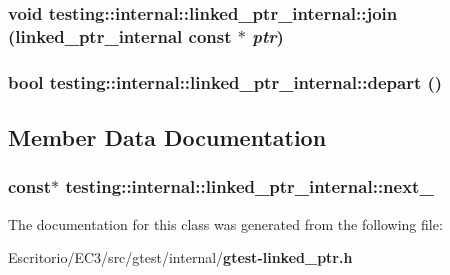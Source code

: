 \subsubsection{\setlength{\rightskip}{0pt plus 5cm}void testing::internal::linked\_\-ptr\_\-internal::join ({\bf linked\_\-ptr\_\-internal} const $\ast$ {\em ptr})\hspace{0.3cm}{\tt  [inline]}}\label{classtesting_1_1internal_1_1linked__ptr__internal_1dc51661a0b98ea373237b3d9eeb2bc9}


\subsubsection{\setlength{\rightskip}{0pt plus 5cm}bool testing::internal::linked\_\-ptr\_\-internal::depart ()\hspace{0.3cm}{\tt  [inline]}}\label{classtesting_1_1internal_1_1linked__ptr__internal_106b031aa6c9ddade172e45a578e8c80}




\subsection{Member Data Documentation}
\subsubsection{ const$\ast$ {\bf testing::internal::linked\_\-ptr\_\-internal::next\_\-}\hspace{0.3cm}{\tt  [mutable, private]}}\label{classtesting_1_1internal_1_1linked__ptr__internal_0a4d24e61d33c5085b4164e37969ac07}




The documentation for this class was generated from the following file:\begin{CompactItemize}
\item 
Escritorio/EC3/src/gtest/internal/{\bf gtest-linked\_\-ptr.h}\end{CompactItemize}

